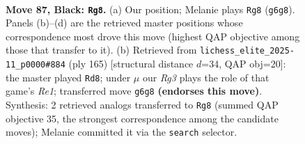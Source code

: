 \documentclass[11pt]{article}
\begin{document}
\clearpage

\begin{figure}[p]\centering
\begin{subfigure}{0.46\textwidth}\centering
\resizebox{\linewidth}{!}{%
\newchessgame
\chessboard[
  setfen={8/8/p3k1r1/Ppp2p1p/2p2P1P/4P1P1/1P1R1K2/8 b - - 20 87},
  showmover=false,
  pgfstyle=straightmove, color=movearrow, markmove={g6-g8}
]}
\caption{}
\end{subfigure}\hfill
\begin{subfigure}{0.46\textwidth}\centering
\resizebox{\linewidth}{!}{%
\newchessgame
\chessboard[
  setfen={4r3/1p6/p1p2kp1/P6p/1P3P1P/4PK2/2R5/8 b - - 2 83},
  showmover=false,
  pgfstyle=straightmove, color=movearrow, markmove={e8-d8}
]}
\caption{}
\end{subfigure}
\\[4pt]

\caption{\textbf{Move 87, Black: \texttt{Rg8}.} (a) Our position; Melanie plays \texttt{Rg8} (\texttt{g6g8}). Panels (b)--(d) are the retrieved master positions whose correspondence most drove this move (highest QAP objective among those that transfer to it). (b) Retrieved from \texttt{lichess\_elite\_2025-11\_p0000\#884} (ply 165) [structural distance $d$=34, QAP obj=20]: the master played \texttt{Rd8}; under $\mu$ our \emph{Rg3} plays the role of that game's \emph{Re1}; transferred move \texttt{g6g8} \textbf{(endorses this move)}. Synthesis: 2 retrieved analogs transferred to \texttt{Rg8} (summed QAP objective 35, the strongest correspondence among the candidate moves); Melanie committed it via the \texttt{search} selector.}
\label{fig:thought-m173}
\end{figure}

\clearpage
\end{document}

